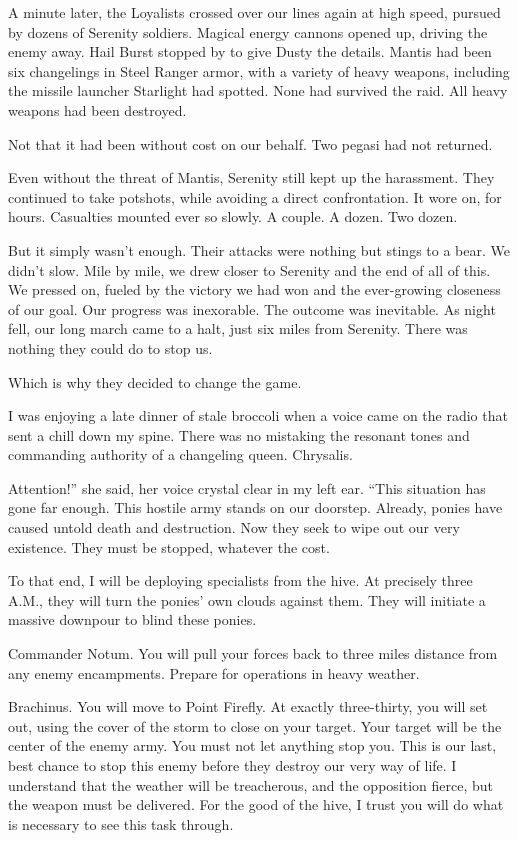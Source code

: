 A minute later, the Loyalists crossed over our lines again at high speed, pursued by dozens of Serenity soldiers. Magical energy cannons opened up, driving the enemy away. Hail Burst stopped by to give Dusty the details. Mantis had been six changelings in Steel Ranger armor, with a variety of heavy weapons, including the missile launcher Starlight had spotted. None had survived the raid. All heavy weapons had been destroyed.

Not that it had been without cost on our behalf. Two pegasi had not returned.

Even without the threat of Mantis, Serenity still kept up the harassment. They continued to take potshots, while avoiding a direct confrontation. It wore on, for hours. Casualties mounted ever so slowly. A couple. A dozen. Two dozen.

But it simply wasn’t enough. Their attacks were nothing but stings to a bear. We didn’t slow. Mile by mile, we drew closer to Serenity and the end of all of this. We pressed on, fueled by the victory we had won and the ever-growing closeness of our goal. Our progress was inexorable. The outcome was inevitable. As night fell, our long march came to a halt, just six miles from Serenity. There was nothing they could do to stop us.

Which is why they decided to change the game.

{\br}%
I was enjoying a late dinner of stale broccoli when a voice came on the radio that sent a chill down my spine. There was no mistaking the resonant tones and commanding authority of a changeling queen. Chrysalis.

\leavevmode{}Attention!” she said, her voice crystal clear in my left ear. “This situation has gone far enough. This hostile army stands on our doorstep. Already, ponies have caused untold death and destruction. Now they seek to wipe out our very existence. They must be stopped, whatever the cost.

\leavevmode{}To that end, I will be deploying specialists from the hive. At precisely three A.M., they will turn the ponies’ own clouds against them. They will initiate a massive downpour to blind these ponies.

\leavevmode{}Commander Notum. You will pull your forces back to three miles distance from any enemy encampments. Prepare for operations in heavy weather.

\leavevmode{}Brachinus. You will move to Point Firefly. At exactly three-thirty, you will set out, using the cover of the storm to close on your target. Your target will be the center of the enemy army. You must not let anything stop you. This is our last, best chance to stop this enemy before they destroy our very way of life. I understand that the weather will be treacherous, and the opposition fierce, but the weapon must be delivered. For the good of the hive, I trust you will do what is necessary to see this task through.

